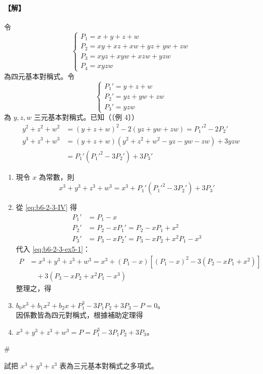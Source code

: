 \paragraph{【解】}
令
\[ \begin{cases}
P_1 = x+y+z+w \\
P_2 = xy+xz+xw+yz+yw+zw \\
P_3 = xyz+xyw+xzw+yzw \\
P_4 = xyzw
\end{cases} \]
為四元基本對稱式。令
\[ \begin{cases}
P_1' = y+z+w \\
P_2' = yz+yw+zw \\
P_3' = yzw
\end{cases} \]
為 $y, z, w$ 三元基本對稱式。已知（〔例 4〕）
\begin{align*}
y^2+z^2+w^2 &= (y+z+w)^2 - 2(yz+yw+zw) = P_1'^2 - 2P_2' \\
y^3+z^3+w^3 &= (y+z+w)(y^2+z^2+w^2-yz-yw-zw) + 3yzw \\
&= P_1'(P_1'^2 - 3P_2') + 3P_3'
\end{align*}
\begin{enumerate}[label=(\Roman*), leftmargin=2em]
  \item 現令 $x$ 為常數，則
  \begin{equation}
  x^3+y^3+z^3+w^3 = x^3 + P_1'(P_1'^2 - 3P_2') + 3P_3' \label{eq:b6-2-3-ex5-1}
  \end{equation}
  \item 從 \eqref{eq:b6-2-3-IV} 得
  \begin{align*}
  P_1' &= P_1 - x \\
  P_2' &= P_2 - x P_1' = P_2 - x P_1 + x^2 \\
  P_3' &= P_3 - x P_2' = P_3 - x P_2 + x^2 P_1 - x^3
  \end{align*}
  代入 \eqref{eq:b6-2-3-ex5-1}：
  \begin{align*}
  P &= x^3+y^3+z^3+w^3 = x^3 + (P_1-x)[(P_1-x)^2 - 3(P_2 - x P_1 + x^2)] \\
  &\quad + 3(P_3 - x P_2 + x^2 P_1 - x^3)
  \end{align*}
  整理之，得
  \item $b_0 x^3 + b_1 x^2 + b_2 x + P_1^3 - 3P_1 P_2 + 3P_3 - P = 0$。\\
  因係數皆為四元對稱式，根據補助定理得
  \item $x^3+y^3+z^3+w^3 = P = P_1^3 - 3P_1 P_2 + 3P_3$。
\end{enumerate}
\hfill$\#$

\begin{example}\label{ex:b6-2-13}
試把 $x^3+y^3+z^3$ 表為三元基本對稱式之多項式。
\end{example}

